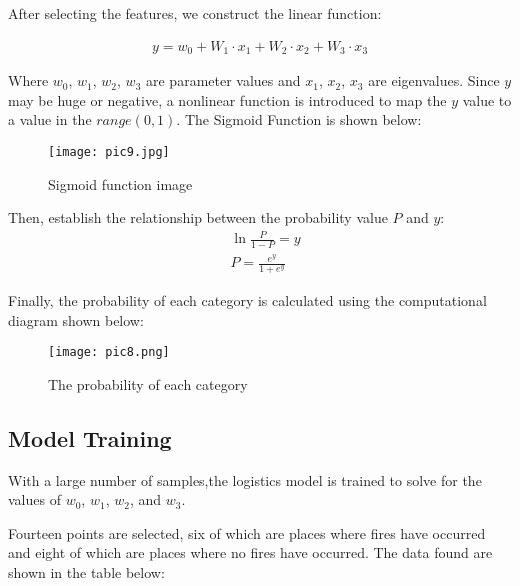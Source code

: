 \documentclass[12pt]{article}  %
\begin{document}
  After selecting the features, we construct the linear function:
 
 \begin{equation}
 	\begin{aligned}
 		y = w_0 + W_1 \cdot x_1 + W_2 \cdot x_2 + W_3 \cdot x_3 
 	\end{aligned}
 \end{equation}
 
 Where $w_0$, $w_1$, $w_2$, $w_3$ are parameter values and $x_1$, $x_2$, $x_3$ are eigenvalues. Since $y$ may be huge or negative, a nonlinear function is introduced to map the $y$ value to a value in the $range(0,1)$. The Sigmoid Function is shown below:
 
 \begin{figure}[htbp]  
 	\centering  
 	\texttt{[image: pic9.jpg]} %
 	\caption{Sigmoid function image} 
 	\label{pic9}
 \end{figure}
 \vspace{-0.5cm}
 
 Then, establish the relationship between the probability value $P$ and $y$:
 \begin{equation}
 	\begin{aligned}
 		& \ln{\frac{P}{1-P}} = y \\
 		& P=\frac{e^y}{1+e^y}
 	\end{aligned}
 \end{equation}
 
 Finally, the probability of each category is calculated using the computational diagram shown below:
 \begin{figure}[htbp]  
 	\centering  
 	\texttt{[image: pic8.png]} 
 	\caption{The probability of each category} 
 	\label{pic8}
 \end{figure}
 \vspace{-0.5cm}
 
 \subsection{Model Training}
 With a large number of samples,the logistics model is trained to solve for the values of $w_0$, $w_1$, $w_2$, and $w_3$.
 
 Fourteen points are selected, six of which are places where fires have occurred and eight of which are places where no fires have occurred. The data found are shown in the table below:
 
\end{document}
